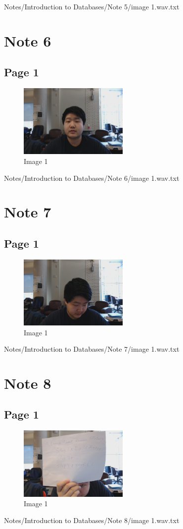 \documentclass{article}%
\begin{document}
%
Notes/Introduction to Databases/Note 5/image 1.wav.txt

%
\section{Note 6}%
\label{sec:Note 6}%
\subsection{Page 1}%
\label{subsec:Page 1}%


\begin{figure}[h!]%
\centering%
\includegraphics[width=200px]{Notes/Introduction to Databases/Note 6/image 1.jpg}%
\caption{Image 1}%
\end{figure}

%
Notes/Introduction to Databases/Note 6/image 1.wav.txt

%
\section{Note 7}%
\label{sec:Note 7}%
\subsection{Page 1}%
\label{subsec:Page 1}%


\begin{figure}[h!]%
\centering%
\includegraphics[width=200px]{Notes/Introduction to Databases/Note 7/image 1.jpg}%
\caption{Image 1}%
\end{figure}

%
Notes/Introduction to Databases/Note 7/image 1.wav.txt

%
\section{Note 8}%
\label{sec:Note 8}%
\subsection{Page 1}%
\label{subsec:Page 1}%


\begin{figure}[h!]%
\centering%
\includegraphics[width=200px]{Notes/Introduction to Databases/Note 8/image 1.jpg}%
\caption{Image 1}%
\end{figure}

%
Notes/Introduction to Databases/Note 8/image 1.wav.txt

%
\end{document}
